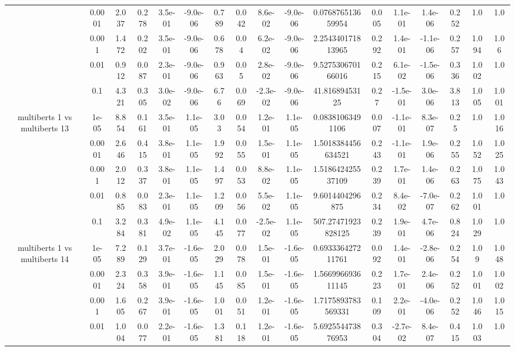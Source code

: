 \begin{tabular}{|c|c|c|c|c|c|c|c|c|c|c|c|c|c|c|c|c|}
 & 0.0001 & 2.037 & 0.278 & 3.5e-01 & -9.0e-06 & 0.789 & 0.042 & 8.6e-02 & -9.0e-06 & 0.076876513659954 & 0.005 & 1.1e-01 & 1.4e-06 & 0.252 & 1.0 & 1.0 \\
 & 0.001 & 1.472 & 0.202 & 3.5e-01 & -9.0e-06 & 0.678 & 0.04 & 6.2e-02 & -9.0e-06 & 2.254340171813965 & 0.292 & 1.4e-01 & -1.1e-06 & 0.257 & 1.094 & 1.06 \\
 & 0.01 & 0.912 & 0.087 & 2.3e-01 & -9.0e-06 & 0.963 & 0.05 & 2.8e-02 & -9.0e-06 & 9.527530670166016 & 0.215 & 6.1e-02 & -1.5e-06 & 0.336 & 1.002 & 1.0 \\
 & 0.1 & 4.321 & 0.305 & 3.0e-02 & -9.0e-06 & 6.76 & 0.069 & -2.3e-02 & -9.0e-06 & 41.81689453125 & 0.27 & -1.5e-01 & 3.0e-06 & 3.813 & 1.005 & 1.001 \\
\hline
\multirow{5}{*}{multiberts 1 vs multiberts 13} & 1e-05 & 8.854 & 0.161 & 3.5e-01 & 1.1e-05 & 3.03 & 0.054 & 1.2e-01 & 1.1e-05 & 0.08381063491106 & 0.007 & -1.1e-01 & 8.3e-07 & 0.25 & 1.0 & 1.016 \\
 & 0.0001 & 2.646 & 0.415 & 3.8e-01 & 1.1e-05 & 1.992 & 0.055 & 1.5e-01 & 1.1e-05 & 1.5018384456634521 & 0.243 & -1.1e-01 & 1.9e-06 & 0.255 & 1.052 & 1.025 \\
 & 0.001 & 2.012 & 0.337 & 3.8e-01 & 1.1e-05 & 1.497 & 0.053 & 8.8e-02 & 1.1e-05 & 1.518642425537109 & 0.239 & 1.7e-01 & 1.4e-06 & 0.263 & 1.075 & 1.043 \\
 & 0.01 & 0.885 & 0.083 & 2.3e-01 & 1.1e-05 & 1.209 & 0.056 & 5.5e-02 & 1.1e-05 & 9.6014404296875 & 0.234 & 8.4e-02 & -7.0e-07 & 0.262 & 1.001 & 1.0 \\
 & 0.1 & 3.284 & 0.381 & 4.9e-02 & 1.1e-05 & 4.145 & 0.077 & -2.5e-02 & 1.1e-05 & 507.27471923828125 & 0.239 & 1.9e-01 & 4.7e-06 & 0.824 & 1.029 & 1.0 \\
\hline
\multirow{5}{*}{multiberts 1 vs multiberts 14} & 1e-05 & 7.289 & 0.129 & 3.7e-01 & -1.6e-05 & 2.029 & 0.078 & 1.5e-01 & -1.6e-05 & 0.693336427211761 & 0.092 & 1.4e-01 & -2.8e-06 & 0.254 & 1.09 & 1.048 \\
 & 0.0001 & 2.324 & 0.358 & 3.9e-01 & -1.6e-05 & 1.145 & 0.085 & 1.5e-01 & -1.6e-05 & 1.566996693611145 & 0.223 & 1.7e-01 & 2.4e-06 & 0.252 & 1.001 & 1.002 \\
 & 0.001 & 1.605 & 0.267 & 3.9e-01 & -1.6e-05 & 1.001 & 0.051 & 1.2e-01 & -1.6e-05 & 1.7175893783569331 & 0.109 & 2.2e-01 & -4.0e-06 & 0.252 & 1.046 & 1.015 \\
 & 0.01 & 1.004 & 0.077 & 2.2e-01 & -1.6e-05 & 1.381 & 0.118 & 1.2e-01 & -1.6e-05 & 5.692554473876953 & 0.304 & -2.7e-02 & 8.4e-07 & 0.415 & 1.003 & 1.0 \\

\end{tabular}
